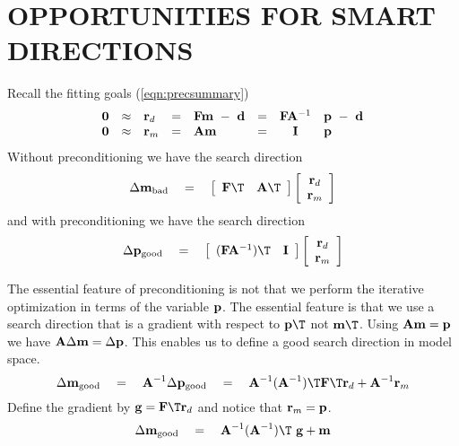 \section{OPPORTUNITIES FOR SMART DIRECTIONS}
Recall the fitting goals (\ref{eqn:precsummary})
\begin{equation}
\begin{array}{llllllcl}
\bold 0 &\approx& \bold r_d &=&  \bold F \bold m \ -\  \bold d   &=&
    \bold F  \bold A^{-1} &\bold p  \ -\  \bold d
    \\
\bold 0 &\approx& \bold r_m &=&  \bold A \bold m       &=&
    \bold I        & \bold p
\end{array}
\label{eqn:precsummary}
\end{equation}
Without preconditioning we have the search direction
\begin{equation}
\Delta \bold m_{\rm bad} \eq
\left[
	\begin{array}{cc}
	\bold F\T & \bold A\T
	\end{array}
\right]
\left[
	\begin{array}{c}
	\bold r_d \\
	\bold r_m
	\end{array}
\right]
\end{equation}
and with preconditioning we have the search direction
\begin{equation}
\Delta \bold p_{\rm good} \eq
\left[
	\begin{array}{cc}
	(\bold F\bold A^{-1})\T & \bold I
	\end{array}
\right]
\left[
	\begin{array}{c}
	\bold r_d \\
	\bold r_m
	\end{array}
\right]
\end{equation}
\par
The essential feature of preconditioning is not that we perform
the iterative optimization in terms of the variable $\bold p$.
The essential feature is that we use a search direction
that is a gradient with respect to $\bold p\T$ not $\bold m\T$.
Using $\bold A\bold m=\bold p$ we have
$\bold A\Delta \bold m=\Delta \bold p$.
This enables us to define a good search direction in model space.
\begin{equation}
\Delta \bold m_{\rm good} \eq \bold A^{-1}
\Delta \bold p_{\rm good} \eq
	\bold A^{-1} (\bold A^{-1})\T
	\bold F\T \bold r_d + \bold  A^{-1} \bold r_m
\end{equation}
Define the gradient by $\bold g=\bold F\T\bold r_d$ and
notice that $\bold r_m=\bold p$.
\begin{equation}
\Delta \bold m_{\rm good} \eq
	\bold A^{-1} (\bold A^{-1})\T \ \bold g
	+ \bold m
\label{eqn:newdirection}
\end{equation}

